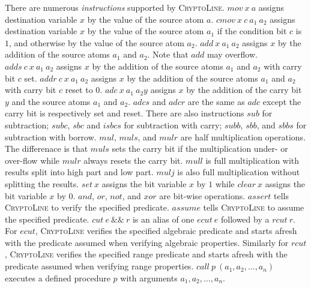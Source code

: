 \documentclass{article}
\newcommand{\cryptoline}{\textsc{CryptoLine}\xspace}
\newcommand{\imov}{\mathit{mov}\xspace}
\newcommand{\iadd}{\mathit{add}\xspace}
\newcommand{\iadds}{\mathit{adds}\xspace}
\newcommand{\iaddr}{\mathit{addr}\xspace}
\newcommand{\iadc}{\mathit{adc}\xspace}
\newcommand{\iadcs}{\mathit{adcs}\xspace}
\newcommand{\iadcr}{\mathit{adcr}\xspace}
\newcommand{\isub}{\mathit{sub}\xspace}
\newcommand{\isubc}{\mathit{subc}\xspace}
\newcommand{\isubb}{\mathit{subb}\xspace}
\newcommand{\isbc}{\mathit{sbc}\xspace}
\newcommand{\isbb}{\mathit{sbb}\xspace}
\newcommand{\isbbs}{\mathit{sbbs}\xspace}
\newcommand{\imul}{\mathit{mul}\xspace}
\newcommand{\imuls}{\mathit{muls}\xspace}
\newcommand{\imulr}{\mathit{mulr}\xspace}
\newcommand{\imull}{\mathit{mull}\xspace}
\newcommand{\imulj}{\mathit{mulj}\xspace}
\newcommand{\iset}{\mathit{set}\xspace}
\newcommand{\iclear}{\mathit{clear}\xspace}
\newcommand{\icmov}{\mathit{cmov}\xspace}
\newcommand{\iand}{\mathit{and}\xspace}
\newcommand{\ior}{\mathit{or}\xspace}
\newcommand{\ixor}{\mathit{xor}\xspace}
\newcommand{\inot}{\mathit{not}\xspace}
\newcommand{\iassert}{\mathit{assert}\xspace}
\newcommand{\iassume}{\mathit{assume}\xspace}
\newcommand{\icut}{\mathit{cut}\xspace}
\newcommand{\iecut}{\mathit{ecut}\xspace}
\newcommand{\ircut}{\mathit{rcut}\xspace}
\newcommand{\icall}{\mathit{call}\xspace}
\newcommand{\band}{\&\&}
\begin{document}
There are numerous \emph{instructions} supported by \cryptoline.
$\imov\ x\ a$ assigns destination variable $x$ by the value of the
source atom $a$.
$\icmov\ x\ c\ a_1\ a_2$ assigns destination variable $x$ by the value of the
source atom $a_1$ if the condition bit $c$ is $1$, and otherwise by
the value of the source atom $a_2$.
$\iadd\ x\ a_1\ a_2$ assigns $x$ by the addition of the source atoms
$a_1$ and $a_2$.
Note that $\iadd$ may overflow.
$\iadds\ c\ x\ a_1\ a_2$ assigns $x$ by the addition of the source atoms
$a_1$ and $a_2$ with carry bit $c$ set.
$\iaddr\ c\ x\ a_1\ a_2$ assigns $x$ by the addition of the source atoms
$a_1$ and $a_2$ with carry bit $c$ reset to $0$.
$\iadc\ x\ a_1\ a_2 y$ assigns $x$ by the addition of the carry bit $y$
and the source atoms $a_1$ and $a_2$.
$\iadcs$ and $\iadcr$ are the same as $\iadc$ except the carry bit is
respectively set and reset.
There are also instructions $\isub$ for subtraction; $\isubc$, $\isbc$
and $isbcs$ for subtraction with carry; $\isubb$, $\isbb$, and
$\isbbs$ for subtraction with borrow.
$\imul$, $\imuls$, and $\imulr$ are half multiplication operations.
The differenace is that $\imuls$ sets the carry bit if the
multiplication under- or over-flow while $\imulr$ always resets the
carry bit.
$\imull$ is full multiplication with results split into high part and
low part.
$\imulj$ is also full multiplication without splitting the results.
$\iset\ x$ assigns the bit variable $x$ by $1$ while $\iclear\ x$
assigns the bit variable $x$ by $0$.
$\iand$, $\ior$, $\inot$, and $\ixor$ are bit-wise operations.
$\iassert$ tells \cryptoline to verify the specified predicate.
$\iassume$ tells \cryptoline to assume the specified predicate.
$\icut\ e\ \band\ r$ is an alias of one $\iecut\ e$ followed by a
$\ircut\ r$.
For $\iecut$, \cryptoline verifies the specified algebraic predicate
and starts afresh with the predicate assumed when verifying algebraic
properties.
Similarly for $\ircut$, \cryptoline verifies the specified range
predicate and starts afresh with the predicate assumed when verifying
range properties.
$\icall\ p\ (a_1, a_2, \ldots, a_n)$ executes a defined procedure $p$
with arguments $a_1, a_2, \ldots, a_n$.
\end{document}
